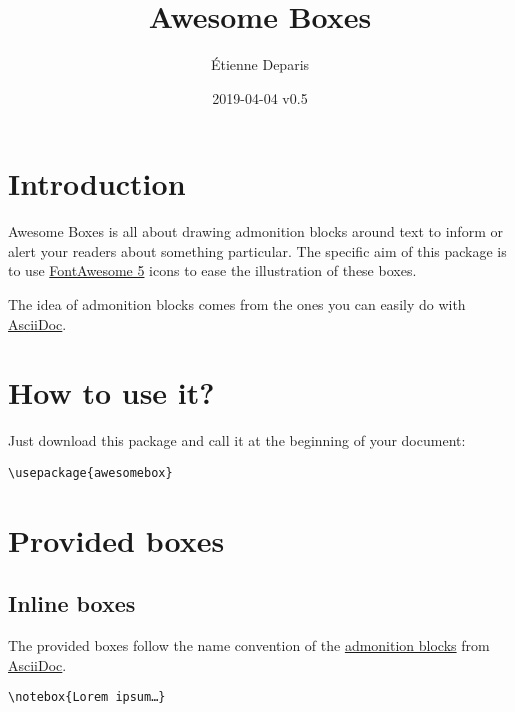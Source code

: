 \documentclass[a4paper,12pt]{article}
\title{Awesome Boxes}
\author{Étienne Deparis}
\date{2019-04-04 v0.5}
\newcommand\hrefcolor[2]{\textcolor{magenta}{\href{#1}{#2}}}
\begin{document}
\maketitle

\section{Introduction}

Awesome Boxes is all about drawing admonition blocks around text to
inform or alert your readers about something particular. The specific
aim of this package is to use
\hrefcolor{https://fontawesome.com/}{FontAwesome 5} icons to ease the
illustration of these boxes.

The idea of admonition blocks comes from the ones you can easily do with
\hrefcolor{http://asciidoctor.org/docs/user-manual/\#admonition}{AsciiDoc}.

\section{How to use it?}

Just download this package and call it at the beginning of your
document:

\begin{center}
\verb!\usepackage{awesomebox}!
\end{center}

\section{Provided boxes}
\subsection{Inline boxes}

The provided boxes follow the name convention of the
\hrefcolor{http://asciidoctor.org/docs/user-manual/\#admonition}{admonition
  blocks} from \hrefcolor{http://asciidoctor.org}{AsciiDoc}.

\begin{center}
\verb!\notebox{Lorem ipsum…}!
\end{center}

\end{document}
